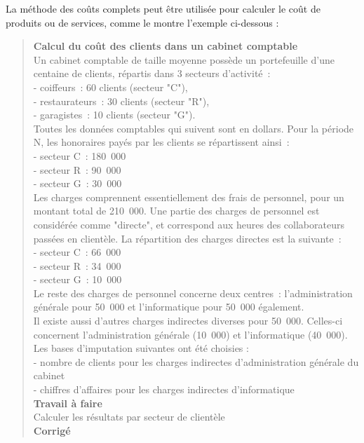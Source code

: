 \documentclass{tufte-handout}
\begin{document}
\begin{enumerate}
\begin{enumerate}
La méthode des coûts complets peut être utilisée pour calculer le coût de produits ou de services, comme le montre l'exemple ci-dessous :\\

\begin{verse}
\textbf{Calcul du coût des clients dans un cabinet comptable}\\
Un cabinet comptable de taille moyenne possède un portefeuille d'une centaine de clients, répartis dans 3 secteurs d'activité :\\
- coiffeurs : 60 clients (secteur "C"),\\
- restaurateurs : 30 clients (secteur "R"),\\
- garagistes : 10 clients (secteur "G").\\
Toutes les données comptables qui suivent sont en dollars. Pour la période N, les honoraires payés par les clients se répartissent ainsi :\\
- secteur C : 180 000\\
- secteur R : 90 000\\
- secteur G : 30 000\\
Les charges comprennent essentiellement des frais de personnel, pour un montant total de 210 000. Une partie des charges de personnel est considérée comme "directe", et correspond aux heures des collaborateurs passées en clientèle. La répartition des charges directes est la suivante :\\
- secteur C : 66 000\\
- secteur R : 34 000\\
- secteur G : 10 000\\
Le reste des charges de personnel concerne deux centres : l'administration générale pour 50 000 et l'informatique pour 50 000 également.\\
Il existe aussi d'autres charges indirectes diverses pour 50 000. Celles-ci concernent l'administration générale (10 000) et l'informatique (40 000).\\
Les bases d'imputation suivantes ont été choisies :\\
- nombre de clients pour les charges indirectes d'administration générale du cabinet\\
- chiffres d'affaires pour les charges indirectes d'informatique\\
\textbf{Travail à faire}\\
Calculer les résultats par secteur de clientèle\\
\textbf{Corrigé}\\

\end{verse}
\end{enumerate}
\end{enumerate}
\end{document}
